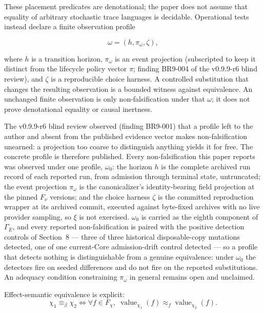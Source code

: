 \documentclass[11pt]{article}
\begin{document}
These placement predicates are denotational; the paper does not assume that
equality of arbitrary stochastic trace languages is decidable. Operational
tests instead declare a finite observation profile

\[
\omega=(h,\pi_{\omega},\zeta),
\]

where \(h\) is a transition horizon, \(\pi_{\omega}\) is an event projection
(subscripted to keep it distinct from the lifecycle policy vector \(\pi\);
finding BR9-004 of the v0.9.9-r6 blind review), and
\(\zeta\) is a reproducible choice harness. A controlled substitution that
changes the resulting observation is a bounded witness against equivalence.
An unchanged finite observation is only non-falsification under that
\(\omega\); it does not prove denotational equality or causal inertness.

The v0.9.9-r6 blind review observed (finding BR9-001) that a profile left to
the author and absent from the published evidence vector makes
non-falsification unearned: a projection too coarse to distinguish anything
yields it for free. The concrete profile is therefore published. Every
non-falsification this paper reports was observed under one profile,
\(\omega_{0}\): the horizon \(h\) is the complete archived run record of each
reported run, from admission through terminal state, untruncated; the event
projection \(\pi_{\omega}\) is the canonicalizer's identity-bearing field
projection at the pinned \(F_\nu\) versions; and the choice harness \(\zeta\)
is the committed reproduction wrapper at its archived commit, executed
against byte-fixed archives with no live provider sampling, so \(\xi\) is not
exercised. \(\omega_{0}\) is carried as the eighth component of \(\Gamma_E\),
and every reported non-falsification is paired with the positive detection
controls of Section~8 — three of three historical disposable-copy mutations
detected, one of one current-Core admission-drift control detected — so a
profile that detects nothing is distinguishable from a genuine equivalence:
under \(\omega_{0}\) the detectors fire on seeded differences and do not fire
on the reported substitutions. An adequacy condition constraining
\(\pi_{\omega}\) in general remains open and unclaimed.

Effect-semantic equivalence is explicit:
\[
\chi_1\equiv_\beta \chi_2
\Longleftrightarrow
\forall f\in F_\chi,\;
\operatorname{value}_{\chi_1}(f)\approx_f
\operatorname{value}_{\chi_2}(f).
\]
\end{document}
